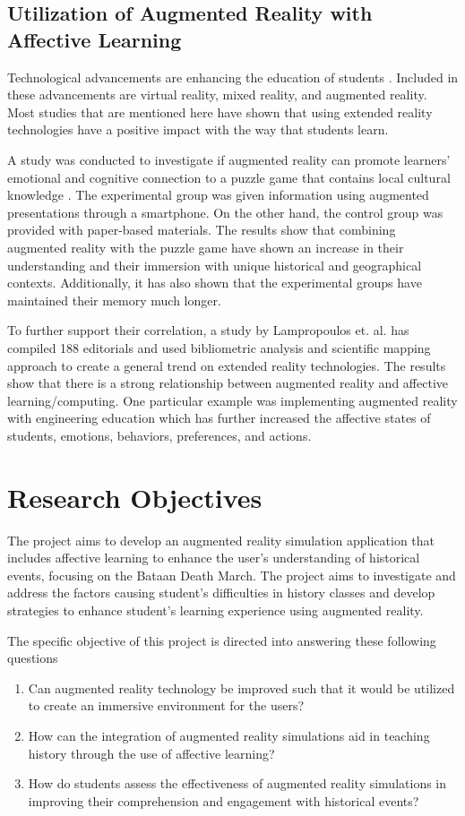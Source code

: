 \subsection{Utilization of Augmented Reality with Affective Learning}
Technological advancements are enhancing the education of students \cite{lamp2024}. Included in these advancements are virtual reality, mixed reality, and augmented reality. Most studies that are mentioned here have shown that using extended reality technologies have a positive impact with the way that students learn.

A study was conducted to investigate if augmented reality can promote learners' emotional and cognitive connection to a puzzle game that contains local cultural knowledge \cite{tsai2024}. The experimental group was given information using augmented presentations through a smartphone. On the other hand, the control group was provided with paper-based materials. The results show that combining augmented reality with the puzzle game have shown an increase in their understanding and their immersion with unique historical and geographical contexts. Additionally, it has also shown that the experimental groups have maintained their memory much longer.

To further support their correlation, a study by Lampropoulos et. al. has compiled 188 editorials and used bibliometric analysis and scientific mapping approach to create a general trend on extended reality technologies. The results show that there is a strong relationship between augmented reality and affective learning/computing. One particular example was implementing augmented reality with engineering education which has further increased the affective states of students, emotions, behaviors, preferences, and actions.


\section{Research Objectives}
The project aims to develop an augmented reality simulation application that includes affective learning to enhance the user's understanding of historical events, focusing on the Bataan Death March. The project aims to investigate and address the factors causing student's difficulties in history classes and develop strategies to enhance student's learning experience using augmented reality.

The specific objective of this project is directed into answering these following questions
\begin{enumerate}
    \item Can augmented reality technology be improved such that it would be utilized to create an immersive environment for the users?
    \item How can the integration of augmented reality simulations aid in teaching history through the use of affective learning?
    \item How do students assess the effectiveness of augmented reality simulations in improving their comprehension and engagement with historical events? 
\end{enumerate}

